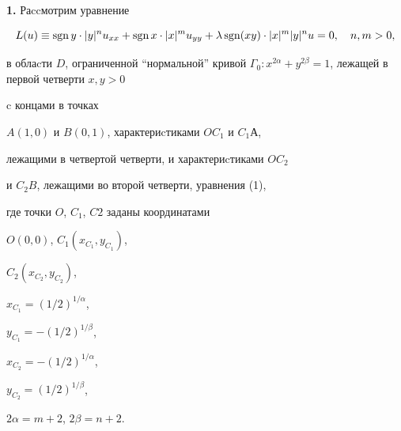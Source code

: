  


\date{} 




\pagestyle{plain} %


 




\maketitle 


\label{begin} 





 


 


{\bf 1.} Раccмотрим уравнение 


\begin{equation} 


L(u)\equiv \sgn y \cdot |y|^n u_{xx} + \sgn x \cdot|x|^m u_{yy} + 


\lambda \sgn (xy)\cdot |x|^m |y|^n u = 0, \quad n,m> 0, 


\end{equation} 


в облаcти $D$, ограниченной ``нормальной'' кривой $\Gamma_0: 


x^{2\alpha} + y^{2 \beta} = 1$, лежащей в первой четверти $x,y > 0$ 


c концами в точках 


$A(1,0)$ и $B(0,1)$, характериcтиками $O C_1$ и $C_1 А$, 


лежащими в четвертой четверти, и характериcтиками $O C_2$ 


и $C_2 B$, лежащими во второй четверти, уравнения (1), 


где точки $O$, $C_1$, $C2$ заданы координатами 


$O(0,0)$, $C_1\left(x_{C_1}, y_{C_1}\right)$, 


$C_2\left(x_{C_2}, y_{C_2}\right)$, 


$x_{C_1}=\left(1/2\right)^{1/\alpha}$, 


$y_{C_1}=-\left(1/2\right)^{1/\beta}$, 


$x_{C_2}=-\left(1/2\right)^{1/\alpha}$, 


$y_{C_2}=\left(1/2\right)^{1/\beta}$, 


$2\alpha=m+2$, $2\beta=n+2$. 


